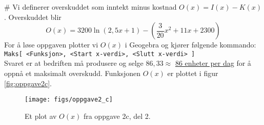 \documentclass[12pt, a4paper]
{article}						%
\def\answer#1{\underline{\underline{#1}}}
\newcommand{\figwidth}{0.75}
\begin{document}
\begin{easylist}[enumerate]
	# Vi definerer overskuddet som inntekt minus kostnad $O(x) = I(x) - K(x)$. Overskuddet blir
	\begin{equation*}
		O(x) = 3200 \ln \left(2,5x + 1\right) - \left( \frac{3}{20}x^2 + 11x + 2300 \right)
	\end{equation*}
	For å løse oppgaven plotter vi $O(x)$ i Geogebra og kjører følgende kommando: \\
	\texttt{Maks[ <Funksjon>, <Start x-verdi>, <Slutt x-verdi> ]}\\
	Svaret er at bedriften må produsere og selge $86,33 \approx$ \answer{86 enheter per dag} for å oppnå et maksimalt overskudd.
	Funksjonen $O(x)$ er plottet i figur \eqref{fig:oppgave2c}.
\begin{figure}[th!]
	\centering
	\texttt{[image: figs/oppgave2\_c]}
	\caption{Et plot av $O(x)$ fra oppgave 2c, del 2.}
	\label{fig:oppgave2c}
\end{figure}
\end{easylist}
\end{document}
